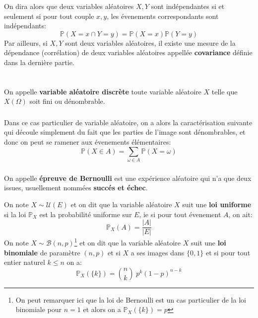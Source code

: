 \subsection*{}
On dira alors que deux variables aléatoires \(X, Y\) sont indépendantes si et seulement si pour tout couple \(x, y\), les évenements correspondants sont indépendants:
\[
   \mathbb{P}(X = x \cap Y = y) = \mathbb{P}(X = x)\mathbb{P}(Y = y)  
\]
Par ailleurs, si \(X, Y\) sont deux variables aléatoires, il existe une mesure de la dépendance (corrélation) de deux variables aléatoires appellée \textbf{covariance} définie dans la dernière partie.

\chapter*{} %
On appelle \textbf{variable aléatoire discrète} toute variable aléatoire \(X\) telle que \(X(\Omega)\) soit fini ou dénombrable.

\subsection*{}
Dans ce cas particulier de variable aléatoire, on a alors la caractérisation suivante qui découle simplement du fait que les parties de l'image sont dénombrables, et donc on peut se ramener aux évenements élémentaires:
\[
   \mathbb{P}(X \in A) = \sum_{\omega \in A} \mathbb{P}(X = \omega) 
\]

\subsection*{}
On appelle \textbf{épreuve de Bernoulli} est une expérience aléatoire qui n'a que deux issues, usuellement nommées \textbf{succés et échec}.\<

On note \(X \sim \mathcal{U}(E)\) et on dit que la variable aléatoire \(X\) suit une \textbf{loi uniforme} si la loi \(\mathbb{P}_X\) est la probabilité uniforme sur \(E\), ie si pour tout évenement \(A\), on ait:
\[
   \mathbb{P}_X(A) = \frac{|A|}{|E|}  
\]
On note \(X \sim \mathcal{B}(n, p)\)\footnote[1]{On peut remarquer ici que la loi de Bernoulli est un cas particulier de la loi binomiale pour \(n = 1\) et alors on a \(\mathbb{P}_X(\{k\}) = p\)} et on dit que la variable aléatoire \(X\) suit une \textbf{loi binomiale} de paramètre \((n, p)\) et  si \(X\) a ses images dans \(\{0, 1\}\) et si pour tout entier naturel \(k \leq n\) on a:
\[
   \mathbb{P}_X(\{k\}) = \binom{n}{k} \; p^k(1-p)^{n-k}
\]

